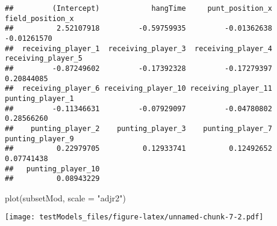 \documentclass[
]{article}
\newenvironment{Shaded}{\begin{snugshade}}{\end{snugshade}}
\newcommand{\AttributeTok}[1]{\textcolor[rgb]{0.77,0.63,0.00}{#1}}
\newcommand{\DecValTok}[1]{\textcolor[rgb]{0.00,0.00,0.81}{#1}}
\newcommand{\FunctionTok}[1]{\textcolor[rgb]{0.00,0.00,0.00}{#1}}
\newcommand{\NormalTok}[1]{#1}
\newcommand{\OtherTok}[1]{\textcolor[rgb]{0.56,0.35,0.01}{#1}}
\newcommand{\SpecialCharTok}[1]{\textcolor[rgb]{0.00,0.00,0.00}{#1}}
\newcommand{\StringTok}[1]{\textcolor[rgb]{0.31,0.60,0.02}{#1}}
\begin{document}
\begin{verbatim}
##         (Intercept)            hangTime     punt_position_x    field_position_x 
##          2.52107918         -0.59759935         -0.01362638         -0.01261570 
##  receiving_player_1  receiving_player_3  receiving_player_4  receiving_player_5 
##         -0.87249602         -0.17392328         -0.17279397          0.20844085 
##  receiving_player_6 receiving_player_10 receiving_player_11    punting_player_1 
##         -0.11346631         -0.07929097         -0.04780802          0.28566260 
##    punting_player_2    punting_player_3    punting_player_7    punting_player_9 
##          0.22979705          0.12933741          0.12492652          0.07741438 
##   punting_player_10 
##          0.08943229
\end{verbatim}

\begin{Shaded}
\begin{Highlighting}[]
\FunctionTok{plot}\NormalTok{(subsetMod, }\AttributeTok{scale =} \StringTok{"adjr2"}\NormalTok{)}
\end{Highlighting}
\end{Shaded}

\texttt{[image: testModels\_files/figure-latex/unnamed-chunk-7-2.pdf]}

\begin{Shaded}
\end{Shaded}
\end{document}
